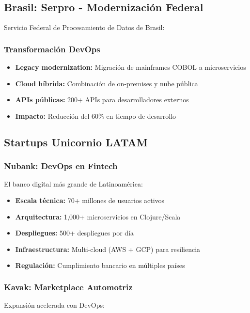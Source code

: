 \documentclass[12pt,a4paper]{article}
\begin{document}
\subsection{Brasil: Serpro - Modernización Federal}
Servicio Federal de Procesamiento de Datos de Brasil:

\subsubsection{Transformación DevOps}
\begin{itemize}
    \item \textbf{Legacy modernization:} Migración de mainframes COBOL a microservicios
    \item \textbf{Cloud híbrida:} Combinación de on-premises y nube pública
    \item \textbf{APIs públicas:} 200+ APIs para desarrolladores externos
    \item \textbf{Impacto:} Reducción del 60\% en tiempo de desarrollo
\end{itemize}

\subsection{Startups Unicornio LATAM}

\subsubsection{Nubank: DevOps en Fintech}
El banco digital más grande de Latinoamérica:

\begin{itemize}
    \item \textbf{Escala técnica:} 70+ millones de usuarios activos
    \item \textbf{Arquitectura:} 1,000+ microservicios en Clojure/Scala
    \item \textbf{Despliegues:} 500+ despliegues por día
    \item \textbf{Infraestructura:} Multi-cloud (AWS + GCP) para resiliencia
    \item \textbf{Regulación:} Cumplimiento bancario en múltiples países
\end{itemize}

\subsubsection{Kavak: Marketplace Automotriz}
Expansión acelerada con DevOps:
\end{document}
